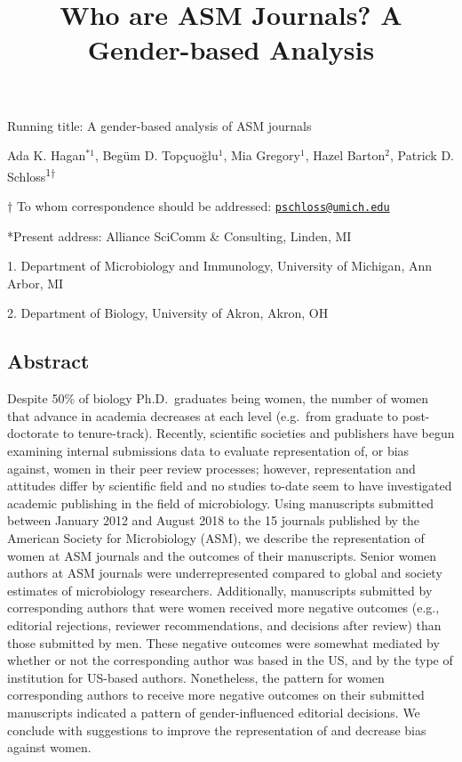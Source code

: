 \documentclass[11pt,]{article}
\title{\textbf{Who are ASM Journals? A Gender-based Analysis}}
\author{}
\date{\vspace{-2.5em}}
\begin{document}
\maketitle

\vspace{35mm}

Running title: A gender-based analysis of ASM journals

\vspace{35mm}

Ada K. Hagan\(^{*1}\), Begüm D. Topçuoğlu\({^1}\), Mia Gregory\({^1}\),
Hazel Barton\({^2}\), Patrick D. Schloss\textsuperscript{1\(\dagger\)}

\vspace{40mm}

\(\dagger\) To whom correspondence should be addressed:
\href{mailto:pschloss@umich.edu}{\nolinkurl{pschloss@umich.edu}}

*Present address: Alliance SciComm \& Consulting, Linden, MI

1. Department of Microbiology and Immunology, University of Michigan,
Ann Arbor, MI

2. Department of Biology, University of Akron, Akron, OH

\newpage

\linenumbers

\subsection{Abstract}\label{abstract}

Despite 50\% of biology Ph.D.~graduates being women, the number of women
that advance in academia decreases at each level (e.g.~from graduate to
post-doctorate to tenure-track). Recently, scientific societies and
publishers have begun examining internal submissions data to evaluate
representation of, or bias against, women in their peer review
processes; however, representation and attitudes differ by scientific
field and no studies to-date seem to have investigated academic
publishing in the field of microbiology. Using manuscripts submitted
between January 2012 and August 2018 to the 15 journals published by the
American Society for Microbiology (ASM), we describe the representation
of women at ASM journals and the outcomes of their manuscripts. Senior
women authors at ASM journals were underrepresented compared to global
and society estimates of microbiology researchers. Additionally,
manuscripts submitted by corresponding authors that were women received
more negative outcomes (e.g., editorial rejections, reviewer
recommendations, and decisions after review) than those submitted by
men. These negative outcomes were somewhat mediated by whether or not
the corresponding author was based in the US, and by the type of
institution for US-based authors. Nonetheless, the pattern for women
corresponding authors to receive more negative outcomes on their
submitted manuscripts indicated a pattern of gender-influenced editorial
decisions. We conclude with suggestions to improve the representation of
and decrease bias against women.
\end{document}
